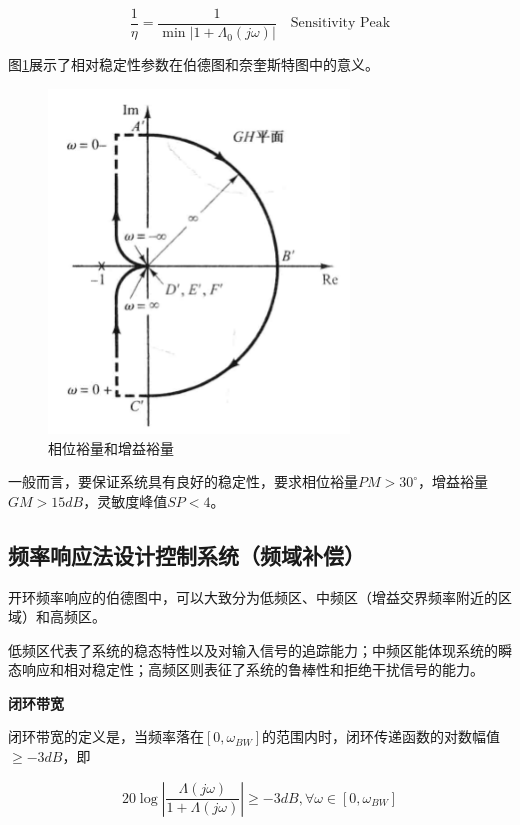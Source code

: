 \begin{equation*}
    \frac{1}{\eta}=\frac{1}{\min|1+\Lambda_0(j\omega)|}\quad\mbox{Sensitivity Peak}
\end{equation*}

图\ref{29}展示了相对稳定性参数在伯德图和奈奎斯特图中的意义。

\begin{figure}[!ht]
    \centering
    \includegraphics[width=8cm]{figures/29.png}
    \caption{相位裕量和增益裕量}
    \label{29}
\end{figure}

一般而言，要保证系统具有良好的稳定性，要求相位裕量$PM>30^\circ$，增益裕量$GM>15dB$，灵敏度峰值$SP<4$。

\subsection{频率响应法设计控制系统（频域补偿）}

开环频率响应的伯德图中，可以大致分为低频区、中频区（增益交界频率附近的区域）和高频区。

低频区代表了系统的稳态特性以及对输入信号的追踪能力；中频区能体现系统的瞬态响应和相对稳定性；高频区则表征了系统的鲁棒性和拒绝干扰信号的能力。

\textbf{闭环带宽}

闭环带宽的定义是，当频率落在$[0,\omega_{BW}]$的范围内时，闭环传递函数的对数幅值$\geq-3dB$，即

\begin{equation*}
    20\log\left|\frac{\Lambda(j\omega)}{1+\Lambda(j\omega)}\right|\geq-3dB, \forall \omega\in[0,\omega_{BW}]
\end{equation*}

